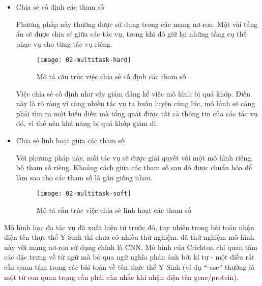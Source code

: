 \documentclass[../main.tex]{subfiles}
\begin{document}
\begin{itemize}

\item Chia sẻ cố định các tham số 

Phương pháp này thường được sử dụng trong các mạng nơ-ron. Một vài tầng ẩn sẽ được chia sẻ giữa các tác vụ, trong khi đó giữ lại những tầng cụ thể phục vụ cho từng tác vụ riêng. 

\begin{figure}[h]
\centering
\texttt{[image: 02-multitask-hard]}
\caption{Mô tả cấu trúc việc chia sẻ cố định các tham số}
\end{figure}

Việc chia sẻ cố định như vậy giảm đáng kể việc mô hình bị quá khớp. Điều này là rõ ràng vì càng nhiều tác vụ ta huấn luyện cùng lúc, mô hình sẽ càng phải tìm ra một biểu diễn mà tổng quát được tất cả thông tin của các tác vụ đó, vì thế nên khả năng bị quá khớp giảm đi. 

\item Chia sẻ linh hoạt giữa các tham số 

Với phương pháp này, mỗi tác vụ sẽ được giải quyết với một mô hình riêng, bộ tham số riêng. Khoảng cách giữa các tham số sau đó được chuẩn hóa để làm sao cho các tham số là gần giống nhau. 

\begin{figure}[h]
\centering
\texttt{[image: 02-multitask-soft]}
\caption{Mô tả cấu trúc việc chia sẻ linh hoạt các tham số}
\end{figure}


\end{itemize}

Mô hình học đa tác vụ đã xuất hiện từ trước đó, tuy nhiên trong bài toán nhận diện tên thực thể Y Sinh thì chưa có nhiều thử nghiệm. \cite{crichton2017neural} đã thử nghiệm mô hình này với mạng nơ-ron sử dụng chính là CNN. Mô hình của Crichton chỉ quan tâm các đặc trưng về từ ngữ mà bỏ qua ngữ nghĩa phản ánh bởi kí tự - một điều rất cần quan tâm trong các bài toán về tên thực thể Y Sinh (ví dụ ``-ase'' thường là một từ con quan trọng cần phải cân nhắc khi nhận diện tên gene/protein). 
\end{document}

